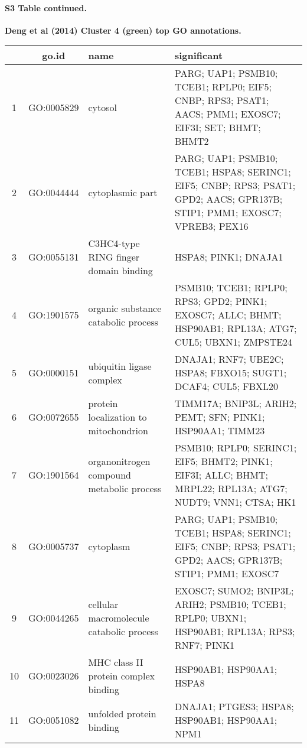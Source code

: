 \documentclass[10pt,letterpaper]{article}
\begin{document}
\paragraph*{S3 Table continued.}
{\bf Deng et al (2014) Cluster 4 (green) top GO annotations.}
\begin{table}[!hp]
\begin{adjustwidth}{-.5in}{0in}
\begin{tabular}{|c|c|p{1.5in}|p{4in}|}
  \hline
 & go.id & name & significant \\
  \hline
1 & GO:0005829 & cytosol & \footnotesize{PARG; UAP1; PSMB10; TCEB1; RPLP0; EIF5; CNBP; RPS3; PSAT1; AACS; PMM1; EXOSC7; EIF3I; SET; BHMT; BHMT2} \\
  2 & GO:0044444 & cytoplasmic part & \footnotesize{PARG; UAP1; PSMB10; TCEB1; HSPA8; SERINC1; EIF5; CNBP; RPS3; PSAT1; GPD2; AACS; GPR137B; STIP1; PMM1; EXOSC7; VPREB3; PEX16} \\
  3 & GO:0055131 & C3HC4-type RING finger domain binding & \footnotesize{HSPA8; PINK1; DNAJA1} \\
  4 & GO:1901575 & organic substance catabolic process & \footnotesize{PSMB10; TCEB1; RPLP0; RPS3; GPD2; PINK1; EXOSC7; ALLC; BHMT; HSP90AB1; RPL13A; ATG7; CUL5; UBXN1; ZMPSTE24} \\
  5 & GO:0000151 & ubiquitin ligase complex & \footnotesize{DNAJA1; RNF7; UBE2C; HSPA8; FBXO15; SUGT1; DCAF4; CUL5; FBXL20} \\
  6 & GO:0072655 & protein localization to mitochondrion & \footnotesize{TIMM17A; BNIP3L; ARIH2; PEMT; SFN; PINK1; HSP90AA1; TIMM23} \\
  7 & GO:1901564 & organonitrogen compound metabolic process & \footnotesize{PSMB10; RPLP0; SERINC1; EIF5; BHMT2; PINK1; EIF3I; ALLC; BHMT; MRPL22; RPL13A; ATG7; NUDT9; VNN1; CTSA; HK1} \\
  8 & GO:0005737 & cytoplasm & \footnotesize{PARG; UAP1; PSMB10; TCEB1; HSPA8; SERINC1; EIF5; CNBP; RPS3; PSAT1; GPD2; AACS; GPR137B; STIP1; PMM1; EXOSC7} \\
  9 & GO:0044265 & cellular macromolecule catabolic process & \footnotesize{EXOSC7; SUMO2; BNIP3L; ARIH2; PSMB10; TCEB1; RPLP0; UBXN1; HSP90AB1; RPL13A; RPS3; RNF7; PINK1} \\
10 & GO:0023026 & MHC class II protein complex binding & \footnotesize{HSP90AB1; HSP90AA1; HSPA8} \\
11 & GO:0051082 & unfolded protein binding & \footnotesize{DNAJA1; PTGES3; HSPA8; HSP90AB1; HSP90AA1; NPM1} \\

\end{tabular}
\end{adjustwidth}
\end{table}
\end{document}
